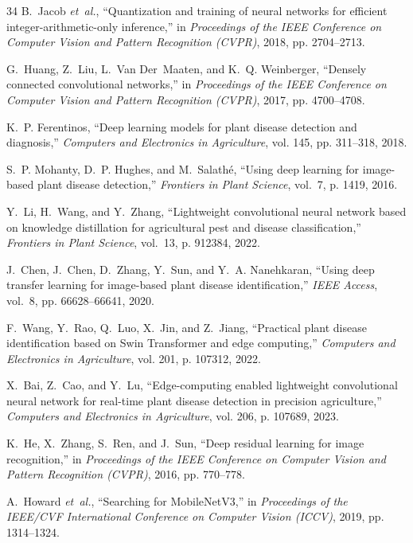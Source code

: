 \documentclass[journal,10pt,twocolumn]{IEEEtran}
\begin{document}
\begin{thebibliography}{34}
B.~Jacob \emph{et~al.}, ``Quantization and training of neural networks for efficient integer-arithmetic-only inference,'' in \emph{Proceedings of the IEEE Conference on Computer Vision and Pattern Recognition (CVPR)}, 2018, pp. 2704--2713.

G.~Huang, Z.~Liu, L.~Van Der~Maaten, and K.~Q. Weinberger, ``Densely connected convolutional networks,'' in \emph{Proceedings of the IEEE Conference on Computer Vision and Pattern Recognition (CVPR)}, 2017, pp. 4700--4708.

K.~P. Ferentinos, ``Deep learning models for plant disease detection and diagnosis,'' \emph{Computers and Electronics in Agriculture}, vol. 145, pp. 311--318, 2018.

S.~P. Mohanty, D.~P. Hughes, and M.~Salath{\'e}, ``Using deep learning for image-based plant disease detection,'' \emph{Frontiers in Plant Science}, vol.~7, p. 1419, 2016.

Y.~Li, H.~Wang, and Y.~Zhang, ``Lightweight convolutional neural network based on knowledge distillation for agricultural pest and disease classification,'' \emph{Frontiers in Plant Science}, vol.~13, p. 912384, 2022.

J.~Chen, J.~Chen, D.~Zhang, Y.~Sun, and Y.~A. Nanehkaran, ``Using deep transfer learning for image-based plant disease identification,'' \emph{IEEE Access}, vol.~8, pp. 66628--66641, 2020.

F.~Wang, Y.~Rao, Q.~Luo, X.~Jin, and Z.~Jiang, ``Practical plant disease identification based on Swin Transformer and edge computing,'' \emph{Computers and Electronics in Agriculture}, vol. 201, p. 107312, 2022.

X.~Bai, Z.~Cao, and Y.~Lu, ``Edge-computing enabled lightweight convolutional neural network for real-time plant disease detection in precision agriculture,'' \emph{Computers and Electronics in Agriculture}, vol. 206, p. 107689, 2023.

K.~He, X.~Zhang, S.~Ren, and J.~Sun, ``Deep residual learning for image recognition,'' in \emph{Proceedings of the IEEE Conference on Computer Vision and Pattern Recognition (CVPR)}, 2016, pp. 770--778.

A.~Howard \emph{et~al.}, ``Searching for MobileNetV3,'' in \emph{Proceedings of the IEEE/CVF International Conference on Computer Vision (ICCV)}, 2019, pp. 1314--1324.


\end{thebibliography}
\end{document}
